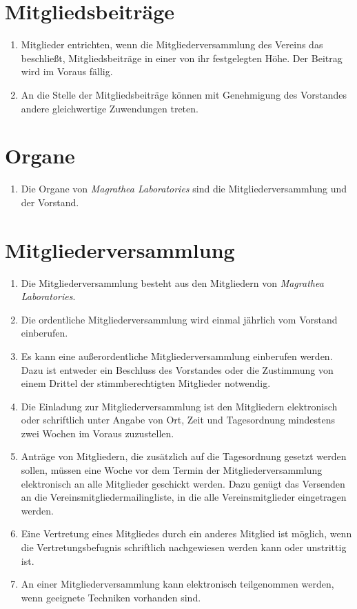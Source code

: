 \documentclass[ngerman]{article}
\begin{document}
\section{Mitgliedsbeiträge}
\begin{enumerate}
\item Mitglieder entrichten, wenn die Mitgliederversammlung des Vereins das beschließt, Mitgliedsbeiträge in einer von ihr festgelegten Höhe. Der Beitrag wird im Voraus fällig.
\item An die Stelle der Mitgliedsbeiträge können mit Genehmigung des Vorstandes andere gleichwertige Zuwendungen treten.
\end{enumerate}

\section{Organe}
\begin{enumerate}
\item Die Organe von \emph{Magrathea Laboratories} sind die Mitgliederversammlung und der Vorstand.
\end{enumerate}

\section{Mitgliederversammlung}
\begin{enumerate}
\item Die Mitgliederversammlung besteht aus den Mitgliedern von \emph{Magrathea Laboratories}.
\item Die ordentliche Mitgliederversammlung wird einmal jährlich vom Vorstand einberufen.
\item Es kann eine außerordentliche Mitgliederversammlung einberufen werden. Dazu ist entweder ein Beschluss des Vorstandes oder die Zustimmung
von einem Drittel der stimmberechtigten Mitglieder notwendig.
\item Die Einladung zur Mitgliederversammlung ist den Mitgliedern elektronisch oder schriftlich unter Angabe von Ort, Zeit und Tagesordnung mindestens zwei Wochen im Voraus zuzustellen.
\item Anträge von Mitgliedern, die zusätzlich auf die Tagesordnung gesetzt werden sollen, müssen eine Woche vor dem Termin der Mitgliederversammlung elektronisch an alle Mitglieder geschickt werden. Dazu genügt das Versenden an die Vereinsmitgliedermailingliste, in die alle Vereinsmitglieder eingetragen werden.
\item Eine Vertretung eines Mitgliedes durch ein anderes Mitglied ist möglich, wenn die Vertretungsbefugnis schriftlich nachgewiesen werden kann oder unstrittig ist.
\item An einer Mitgliederversammlung kann elektronisch teilgenommen werden, wenn geeignete Techniken vorhanden sind.
\end{enumerate}
\end{document}
